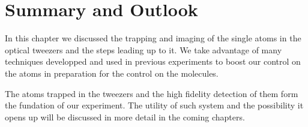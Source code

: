 
\section{Summary and Outlook}
\label{ch:loading:summary}


In this chapter we discussed the trapping and imaging of the single atoms in the optical
tweezers and the steps leading up to it.
We take advantage of many techniques developped and used in previous experiments
to boost our control on the atoms in preparation for the control on the molecules.

The atoms trapped in the tweezers and the high fidelity detection of them
form the fundation of our experiment.
The utility of such system and the possibility it opens up will be discussed
in more detail in the coming chapters.

